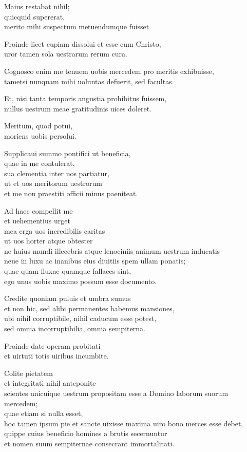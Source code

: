\documentclass[a5paper,twoside]{article}
\begin{document}
Maius restabat nihil; \\
quicquid supererat, \\
merito mihi suspectum metuendumque fuisset.   

Proinde licet cupiam dissolui et esse cum Christo, \\
uror tamen sola uestrarum rerum cura.  

Cognosco enim me tenuem uobis mercedem pro meritis exhibuisse, \\
tametsi nunquam mihi uoluntas defuerit, sed facultas.  

Et, nisi tanta temporis angustia prohibitus fuissem, \\
nullus uestrum meae gratitudinis uices doleret.  

Meritum, quod potui, \\
moriens uobis persolui.  

Supplicaui summo pontifici ut beneficia, \\
quae in me contulerat, \\
sua clementia inter uos partiatur, \\
ut et uos meritorum uestrorum \\
et me non praestiti officii minus paeniteat.  

Ad haec compellit me \\
et uehementius urget \\
mea erga uos incredibilis caritas \\
ut uos horter atque obtester \\
ne huius mundi illecebris atque lenociniis animum uestrum inducatis \\
neue in luxu ac inanibus eius diuitiis spem ullam ponatis; \\
quae quam fluxae quamque fallaces sint, \\
ego unus uobis maximo possum esse documento.   

Credite quoniam puluis et umbra sumus \\
et non hic, sed alibi permanentes habemus mansiones, \\
ubi nihil corruptibile, nihil caducum esse potest, \\
sed omnia incorruptibilia, omnia sempiterna.  

Proinde date operam probitati \\
et uirtuti totis uiribus incumbite.  

Colite pietatem \\
et integritati nihil anteponite \\
scientes unicuique uestrum propositam esse a Domino laborum suorum mercedem; \\
quae etiam si nulla esset, \\
hoc tamen ipsum pie et sancte uixisse maxima uiro bono merces esse debet, \\
quippe cuius beneficio homines a brutis secernuntur \\
et nomen suum sempiternae consecrant immortalitati.
\end{document}
